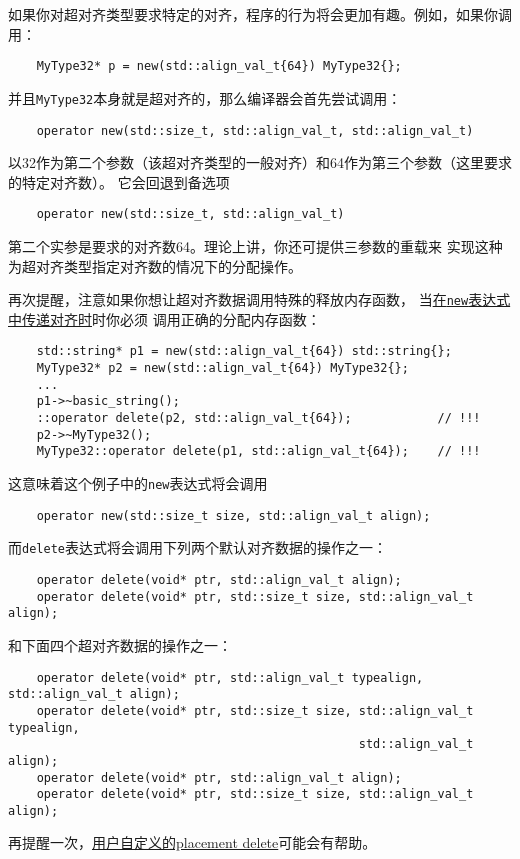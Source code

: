 如果你对超对齐类型要求特定的对齐，程序的行为将会更加有趣。例如，如果你调用：
\begin{lstlisting}
    MyType32* p = new(std::align_val_t{64}) MyType32{};
\end{lstlisting}
并且\texttt{MyType32}本身就是超对齐的，那么编译器会首先尝试调用：
\begin{lstlisting}
    operator new(std::size_t, std::align_val_t, std::align_val_t)
\end{lstlisting}
以32作为第二个参数（该超对齐类型的一般对齐）和64作为第三个参数（这里要求的特定对齐数）。
它会回退到备选项
\begin{lstlisting}
    operator new(std::size_t, std::align_val_t)
\end{lstlisting}
第二个实参是要求的对齐数64。理论上讲，你还可提供三参数的重载来
实现这种为超对齐类型指定对齐数的情况下的分配操作。

再次提醒，注意如果你想让超对齐数据调用特殊的释放内存函数，
当\hyperref[ch30.1.2]{在\texttt{new}表达式中传递对齐时}时你必须
调用正确的分配内存函数：\label{类型特定delete}
\begin{lstlisting}
    std::string* p1 = new(std::align_val_t{64}) std::string{};
    MyType32* p2 = new(std::align_val_t{64}) MyType32{};
    ...
    p1->~basic_string();
    ::operator delete(p2, std::align_val_t{64});            // !!!
    p2->~MyType32();
    MyType32::operator delete(p1, std::align_val_t{64});    // !!!
\end{lstlisting}
这意味着这个例子中的\texttt{new}表达式将会调用
\begin{lstlisting}
    operator new(std::size_t size, std::align_val_t align);
\end{lstlisting}
而\texttt{delete}表达式将会调用下列两个默认对齐数据的操作之一：
\begin{lstlisting}
    operator delete(void* ptr, std::align_val_t align);
    operator delete(void* ptr, std::size_t size, std::align_val_t align);
\end{lstlisting}
和下面四个超对齐数据的操作之一：
\begin{lstlisting}
    operator delete(void* ptr, std::align_val_t typealign, std::align_val_t align);
    operator delete(void* ptr, std::size_t size, std::align_val_t typealign,
                                                 std::align_val_t align);
    operator delete(void* ptr, std::align_val_t align);
    operator delete(void* ptr, std::size_t size, std::align_val_t align);
\end{lstlisting}
再提醒一次，\hyperref[ch30.1.2.2]{用户自定义的placement delete}可能会有帮助。


